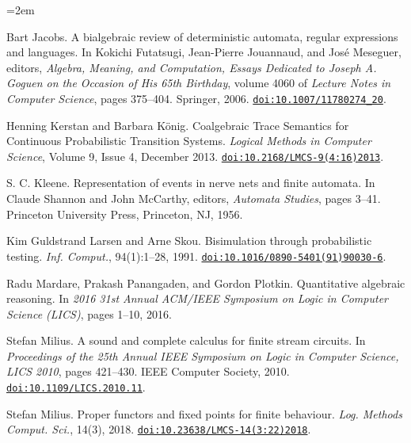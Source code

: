 \begin{list}{}{\leftmargin=2em}
\hypertarget{html:bib.bib8}{}
\item[]  [8]  Bart Jacobs.  A bialgebraic review of deterministic automata, regular expressions and languages.  In Kokichi Futatsugi, Jean-Pierre Jouannaud, and José Meseguer, editors, \emph{Algebra, Meaning, and Computation, Essays Dedicated to Joseph A. Goguen on the Occasion of His 65th Birthday}, volume 4060 of \emph{Lecture Notes in Computer Science}, pages 375–404. Springer, 2006.  \href{https://doi.org/10.1007/11780274_20}{\nolinkurl{doi:10.1007/11780274_20}}.  
\hypertarget{html:bib.bib9}{}
\item[]  [9]  Henning Kerstan and Barbara König.  Coalgebraic Trace Semantics for Continuous Probabilistic Transition Systems.  \emph{Logical Methods in Computer Science}, Volume 9, Issue 4, December 2013.  \href{https://doi.org/10.2168/LMCS-9(4:16)2013}{\nolinkurl{doi:10.2168/LMCS-9(4:16)2013}}.  
\hypertarget{html:bib.bib10}{}
\item[]  [10]  S. C. Kleene.  Representation of events in nerve nets and finite automata.  In Claude Shannon and John McCarthy, editors, \emph{Automata Studies}, pages 3–41. Princeton University Press, Princeton, NJ, 1956.  
\hypertarget{html:bib.bib11}{}
\item[]  [11]  Kim Guldstrand Larsen and Arne Skou.  Bisimulation through probabilistic testing.  \emph{Inf. Comput.}, 94(1):1–28, 1991.  \href{https://doi.org/10.1016/0890-5401(91)90030-6}{\nolinkurl{doi:10.1016/0890-5401(91)90030-6}}.  
\hypertarget{html:bib.bib12}{}
\item[]  [12]  Radu Mardare, Prakash Panangaden, and Gordon Plotkin.  Quantitative algebraic reasoning.  In \emph{2016 31st Annual ACM/IEEE Symposium on Logic in Computer Science (LICS)}, pages 1–10, 2016.  
\hypertarget{html:bib.bib13}{}
\item[]  [13]  Stefan Milius.  A sound and complete calculus for finite stream circuits.  In \emph{Proceedings of the 25th Annual IEEE Symposium on Logic in Computer Science, LICS 2010}, pages 421–430. IEEE Computer Society, 2010.  \href{https://doi.org/10.1109/LICS.2010.11}{\nolinkurl{doi:10.1109/LICS.2010.11}}.  
\hypertarget{html:bib.bib14}{}
\item[]  [14]  Stefan Milius.  Proper functors and fixed points for finite behaviour.  \emph{Log. Methods Comput. Sci.}, 14(3), 2018.  \href{https://doi.org/10.23638/LMCS-14(3:22)2018}{\nolinkurl{doi:10.23638/LMCS-14(3:22)2018}}.  

\end{list}
